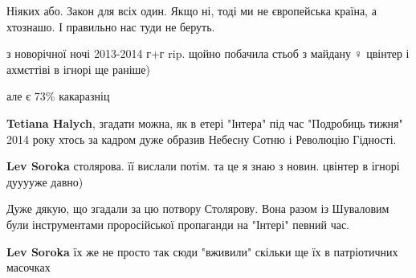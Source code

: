 \begin{itemize}
Ніяких або. Закон для всіх один. Якщо ні, тоді ми не європейська країна, а хтознашо. І правильно нас туди не беруть.

 

з новорічної ночі 2013-2014 г+г rip. щойно побачила стьоб з майдану🤦♀️ цвінтер
і ахмєттіві в ігнорі ще раніше)

але є 73\% какаразніц

\begin{itemize}
 
\textbf{Tetiana Halych}, згадати можна, як в етері "Інтера" під час "Подробиць тижня" 2014 року хтось за кадром дуже образив Небесну Сотню і Революцію Гідності.

 
\textbf{Lev Soroka} столярова. її вислали потім. та це я знаю з новин. цвінтер в ігнорі дууууже давно)

 
Дуже дякую, що згадали за цю потвору Столярову. Вона разом із Шуваловим були інструментами проросійської пропаганди на "Інтері" певний час.

 
\textbf{Lev Soroka} їх же не просто так сюди "вживили"
скільки ще їх в патріотичних масочках

 

\end{itemize}
\end{itemize}
